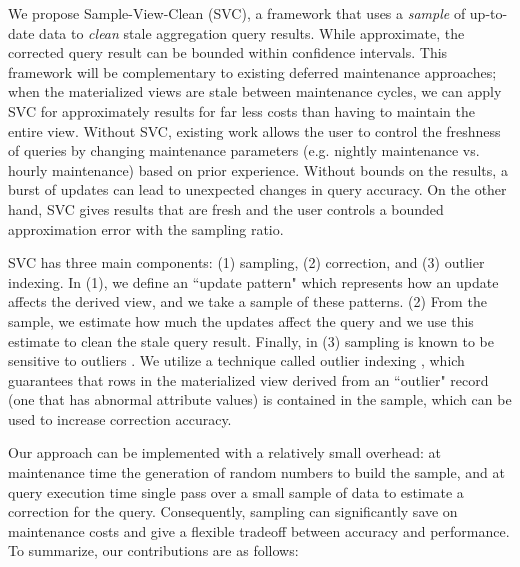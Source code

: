 We propose Sample-View-Clean (SVC), a framework that uses a \emph{sample} of up-to-date data to \emph{clean} stale aggregation query results.
While approximate, the corrected query result can be bounded within confidence intervals.
This framework will be complementary to existing deferred maintenance approaches; when the materialized views are stale between maintenance cycles, we can apply SVC for approximately results for far less costs than having to maintain the entire view.
Without SVC, existing work allows the user to control the freshness of queries by changing maintenance parameters (e.g. nightly maintenance vs. hourly maintenance) based on prior experience.
Without bounds on the results, a burst of updates can lead to unexpected changes in query accuracy.
On the other hand, SVC gives results that are fresh and the user controls a bounded approximation error with the sampling ratio.



SVC has three main components: (1) sampling, (2) correction, and (3) outlier indexing. In (1), we define an ``update pattern" which represents how an update affects the derived view, and we take a sample of these patterns. (2)  From the sample, we estimate how much the updates affect the query and we use this estimate to clean the stale query result.
Finally, in (3) sampling is known to be sensitive to outliers \cite{chaudhuri2001overcoming}.
We utilize a technique called outlier indexing \cite{chaudhuri2001overcoming}, which guarantees that rows in the materialized view derived from an ``outlier" record (one that has abnormal attribute values) is contained in the sample, which can be used to increase correction accuracy.

Our approach can be implemented with a relatively small overhead: at maintenance time the generation of random numbers to build the sample, and at query execution time single pass over a small sample of data to estimate a correction for the query.
Consequently, sampling can significantly save on maintenance costs and give a flexible tradeoff between accuracy and performance.
To summarize, our contributions are as follows:

